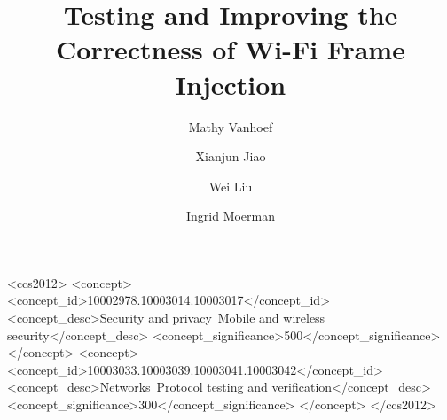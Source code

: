 \documentclass[sigconf]{acmart}
\newcommand{\wifi}{\mbox{Wi-Fi}}
\begin{document}
\title{Testing and Improving the Correctness of \wifi{} Frame Injection}

\author{Mathy Vanhoef}

\author{Xianjun Jiao}

\author{Wei Liu}

\author{Ingrid Moerman}

\renewcommand{\shortauthors}{Mathy Vanhoef, Xianjun Jiao, Wei Liu \& Ingrid Moerman}

\begin{CCSXML}
<ccs2012>
   <concept>
       <concept_id>10002978.10003014.10003017</concept_id>
       <concept_desc>Security and privacy~Mobile and wireless security</concept_desc>
       <concept_significance>500</concept_significance>
       </concept>
   <concept>
       <concept_id>10003033.10003039.10003041.10003042</concept_id>
       <concept_desc>Networks~Protocol testing and verification</concept_desc>
       <concept_significance>300</concept_significance>
       </concept>
 </ccs2012>
\end{CCSXML}



\end{document}
